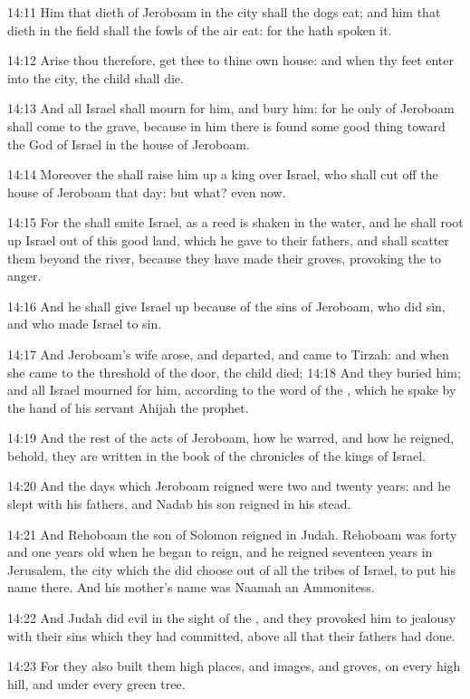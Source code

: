 14:11 Him that dieth of Jeroboam in the city shall the dogs eat; and him that dieth in the field shall the fowls of the air eat: for the \LORD hath spoken it.

14:12 Arise thou therefore, get thee to thine own house: and when thy feet enter into the city, the child shall die.

14:13 And all Israel shall mourn for him, and bury him: for he only of Jeroboam shall come to the grave, because in him there is found some good thing toward the \LORD God of Israel in the house of Jeroboam.

14:14 Moreover the \LORD shall raise him up a king over Israel, who shall cut off the house of Jeroboam that day: but what? even now.

14:15 For the \LORD shall smite Israel, as a reed is shaken in the water, and he shall root up Israel out of this good land, which he gave to their fathers, and shall scatter them beyond the river, because they have made their groves, provoking the \LORD to anger.

14:16 And he shall give Israel up because of the sins of Jeroboam, who did sin, and who made Israel to sin.

14:17 And Jeroboam's wife arose, and departed, and came to Tirzah: and when she came to the threshold of the door, the child died; 14:18 And they buried him; and all Israel mourned for him, according to the word of the \LORD, which he spake by the hand of his servant Ahijah the prophet.

14:19 And the rest of the acts of Jeroboam, how he warred, and how he reigned, behold, they are written in the book of the chronicles of the kings of Israel.

14:20 And the days which Jeroboam reigned were two and twenty years: and he slept with his fathers, and Nadab his son reigned in his stead.

14:21 And Rehoboam the son of Solomon reigned in Judah. Rehoboam was forty and one years old when he began to reign, and he reigned seventeen years in Jerusalem, the city which the \LORD did choose out of all the tribes of Israel, to put his name there. And his mother's name was Naamah an Ammonitess.

14:22 And Judah did evil in the sight of the \LORD, and they provoked him to jealousy with their sins which they had committed, above all that their fathers had done.

14:23 For they also built them high places, and images, and groves, on every high hill, and under every green tree.

